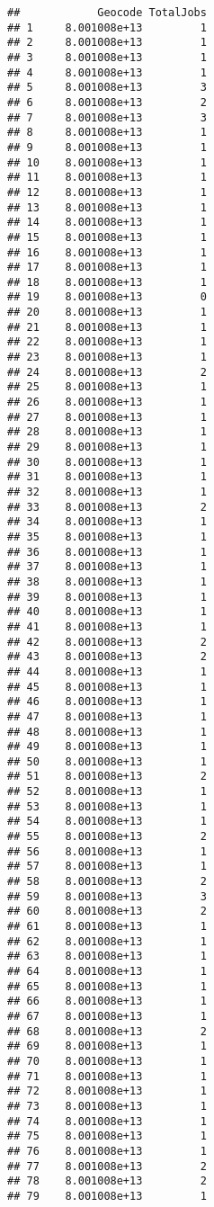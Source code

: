 \documentclass[
]{article}
\begin{document}
\begin{verbatim}
##            Geocode TotalJobs
## 1     8.001008e+13         1
## 2     8.001008e+13         1
## 3     8.001008e+13         1
## 4     8.001008e+13         1
## 5     8.001008e+13         3
## 6     8.001008e+13         2
## 7     8.001008e+13         3
## 8     8.001008e+13         1
## 9     8.001008e+13         1
## 10    8.001008e+13         1
## 11    8.001008e+13         1
## 12    8.001008e+13         1
## 13    8.001008e+13         1
## 14    8.001008e+13         1
## 15    8.001008e+13         1
## 16    8.001008e+13         1
## 17    8.001008e+13         1
## 18    8.001008e+13         1
## 19    8.001008e+13         0
## 20    8.001008e+13         1
## 21    8.001008e+13         1
## 22    8.001008e+13         1
## 23    8.001008e+13         1
## 24    8.001008e+13         2
## 25    8.001008e+13         1
## 26    8.001008e+13         1
## 27    8.001008e+13         1
## 28    8.001008e+13         1
## 29    8.001008e+13         1
## 30    8.001008e+13         1
## 31    8.001008e+13         1
## 32    8.001008e+13         1
## 33    8.001008e+13         2
## 34    8.001008e+13         1
## 35    8.001008e+13         1
## 36    8.001008e+13         1
## 37    8.001008e+13         1
## 38    8.001008e+13         1
## 39    8.001008e+13         1
## 40    8.001008e+13         1
## 41    8.001008e+13         1
## 42    8.001008e+13         2
## 43    8.001008e+13         2
## 44    8.001008e+13         1
## 45    8.001008e+13         1
## 46    8.001008e+13         1
## 47    8.001008e+13         1
## 48    8.001008e+13         1
## 49    8.001008e+13         1
## 50    8.001008e+13         1
## 51    8.001008e+13         2
## 52    8.001008e+13         1
## 53    8.001008e+13         1
## 54    8.001008e+13         1
## 55    8.001008e+13         2
## 56    8.001008e+13         1
## 57    8.001008e+13         1
## 58    8.001008e+13         2
## 59    8.001008e+13         3
## 60    8.001008e+13         2
## 61    8.001008e+13         1
## 62    8.001008e+13         1
## 63    8.001008e+13         1
## 64    8.001008e+13         1
## 65    8.001008e+13         1
## 66    8.001008e+13         1
## 67    8.001008e+13         1
## 68    8.001008e+13         2
## 69    8.001008e+13         1
## 70    8.001008e+13         1
## 71    8.001008e+13         1
## 72    8.001008e+13         1
## 73    8.001008e+13         1
## 74    8.001008e+13         1
## 75    8.001008e+13         1
## 76    8.001008e+13         1
## 77    8.001008e+13         2
## 78    8.001008e+13         2
## 79    8.001008e+13         1

\end{verbatim}
\end{document}

